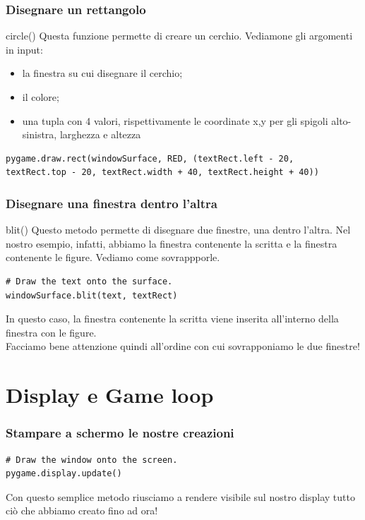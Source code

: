 \documentclass{beamer}
\begin{document}
\begin{frame}[fragile]
\frametitle{Disegnare un rettangolo}
\begin{block}{circle()}
	Questa funzione permette di creare un cerchio. Vediamone gli argomenti in input:
	\begin{itemize}
		\item la finestra su cui disegnare il cerchio;
		\item il colore;
		\item una tupla con 4 valori, rispettivamente le coordinate x,y per gli spigoli alto-sinistra, larghezza e altezza 
	\end{itemize}
\end{block}
\begin{lstlisting}
pygame.draw.rect(windowSurface, RED, (textRect.left - 20,
textRect.top - 20, textRect.width + 40, textRect.height + 40))

\end{lstlisting}
\end{frame}

\begin{frame}[fragile]
\frametitle{Disegnare una finestra dentro l'altra}
\begin{block}{blit()}
	Questo metodo permette di disegnare due finestre, una dentro l'altra. Nel nostro esempio, infatti, abbiamo la finestra contenente la scritta e la finestra contenente le figure. Vediamo come sovrappporle.
\end{block}
\begin{lstlisting}
# Draw the text onto the surface.
windowSurface.blit(text, textRect)
\end{lstlisting}
In questo caso, la finestra contenente la scritta viene inserita all'interno della finestra con le figure.\\
Facciamo bene attenzione quindi all'ordine con cui sovrapponiamo le due finestre!
\end{frame}

\section{Display e Game loop}

\begin{frame}[fragile]
\frametitle{Stampare a schermo le nostre creazioni}
\begin{lstlisting}
# Draw the window onto the screen.
pygame.display.update()
\end{lstlisting}
Con questo semplice metodo riusciamo a rendere visibile sul nostro display tutto ciò che abbiamo creato fino ad ora!
\end{frame}
\end{document}
